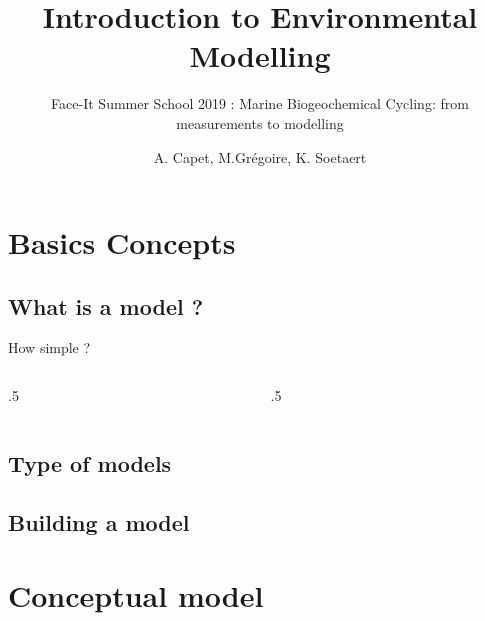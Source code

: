 \documentclass[final,xcolor=dvipsnames]{beamer}
\title[Introduction to Environmental Modelling]{Introduction to Environmental Modelling}
\subtitle{Face-It Summer School 2019 : Marine Biogeochemical Cycling: from measurements to modelling}
\author[A. Capet]{A. Capet, M.Grégoire, K. Soetaert} %
\institute[http://labos.ulg.ac.be/mast/]{MAST - acapet@ulg.ac.be}
\date[Oct 2019]
\begin{document}
\def\mussel{\PHoxBack}
\def\extitle[#1]{\centering{ \mussel \hspace{2cm} #1 \hspace{2cm} \mussel}}

\begin{frame}
  \titlepage
\end{frame}


\section{Basics Concepts}
\subsection{What is a model ?}
\begin{frame}
\end{frame}

\begin{frame}{How simple ?}
\begin{columns}
\begin{column}{.5\framewidth}
\end{column}
\begin{column}{.5\framewidth}
\end{column}
\end{columns}
\end{frame}

\subsection{Type of models}




\subsection{Building a model}

\section{Conceptual model}
\end{document}
